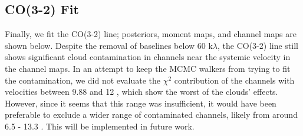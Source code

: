 



\subsection{CO(3-2) Fit}
\label{subsection:co_fit}
Finally, we fit the CO(3-2) line; posteriors, moment maps, and channel maps are shown below. Despite the removal of baselines below 60 k$\lambda$, the CO(3-2) line still shows significant cloud contamination in channels near the systemic velocity in the channel maps. In an attempt to keep the MCMC walkers from trying to fit the contamination, we did not evaluate the $\chi^2$ contribution of the channels with velocities between 9.88 and 12 \kms, which show the worst of the clouds' effects. However, since it seems that this range was insufficient, it would have been preferable to exclude a wider range of contaminated channels, likely from around 6.5 - 13.3 \kms. This will be implemented in future work.



